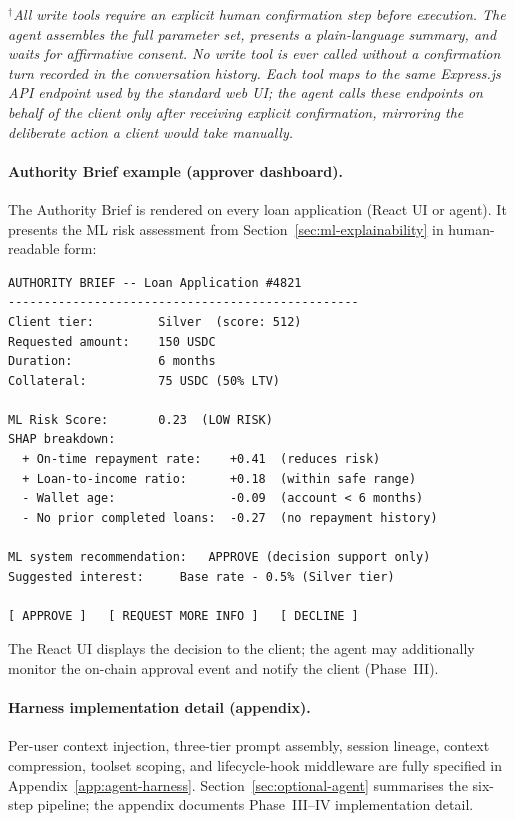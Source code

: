 \documentclass[12pt,a4paper]{report}
\begin{document}
\begin{table}[H]
\vspace{4pt}
\noindent\small$^{\dagger}$\textit{All write tools require an explicit human confirmation step before execution. The agent assembles the full parameter set, presents a plain-language summary, and waits for affirmative consent. No write tool is ever called without a confirmation turn recorded in the conversation history. Each tool maps to the same Express.js API endpoint used by the standard web UI; the agent calls these endpoints on behalf of the client only after receiving explicit confirmation, mirroring the deliberate action a client would take manually.}
\end{table}

\paragraph{Authority Brief example (approver dashboard).}

The Authority Brief is rendered on every loan application (React UI or agent). It presents the ML risk assessment from Section~\ref{sec:ml-explainability} in human-readable form:

\begin{verbatim}
AUTHORITY BRIEF -- Loan Application #4821
-------------------------------------------------
Client tier:         Silver  (score: 512)
Requested amount:    150 USDC
Duration:            6 months
Collateral:          75 USDC (50% LTV)

ML Risk Score:       0.23  (LOW RISK)
SHAP breakdown:
  + On-time repayment rate:    +0.41  (reduces risk)
  + Loan-to-income ratio:      +0.18  (within safe range)
  - Wallet age:                -0.09  (account < 6 months)
  - No prior completed loans:  -0.27  (no repayment history)

ML system recommendation:   APPROVE (decision support only)
Suggested interest:     Base rate - 0.5% (Silver tier)

[ APPROVE ]   [ REQUEST MORE INFO ]   [ DECLINE ]
\end{verbatim}

\noindent The React UI displays the decision to the client; the agent may additionally monitor the on-chain approval event and notify the client (Phase~III).

\paragraph{Harness implementation detail (appendix).}
Per-user context injection, three-tier prompt assembly, session lineage, context compression, toolset scoping, and lifecycle-hook middleware are fully specified in Appendix~\ref{app:agent-harness}. Section~\ref{sec:optional-agent} summarises the six-step pipeline; the appendix documents Phase~III--IV implementation detail.
\end{document}
